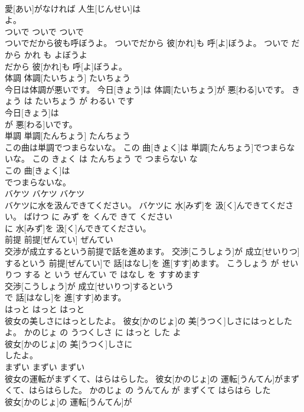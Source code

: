 \documentclass[8pt]{extreport}
\begin{document}
\begin{CJK}{UTF8}{min}
\\	愛[あい]がなければ 人生[じんせい]は
\\	よ。			
\\	ついで	ついで	ついで	
\\	ついでだから彼も呼ぼうよ。	ついでだから 彼[かれ]も 呼[よ]ぼうよ。	ついで だから かれ も よぼうよ	
\\	だから 彼[かれ]も 呼[よ]ぼうよ。			
\\	体調	体調[たいちょう]	たいちょう	
\\	今日は体調が悪いです。	今日[きょう]は 体調[たいちょう]が 悪[わる]いです。	きょう は たいちょう が わるい です	
\\	今日[きょう]は
\\	が 悪[わる]いです。			
\\	単調	単調[たんちょう]	たんちょう	
\\	この曲は単調でつまらないな。	この 曲[きょく]は 単調[たんちょう]でつまらないな。	この きょく は たんちょう で つまらない な	
\\	この 曲[きょく]は
\\	でつまらないな。			
\\	バケツ	バケツ	バケツ	
\\	バケツに水を汲んできてください。	バケツに 水[みず]を 汲[く]んできてください。	ばけつ に みず を くんで きて ください	
\\	に 水[みず]を 汲[く]んできてください。			
\\	前提	前提[ぜんてい]	ぜんてい	
\\	交渉が成立するという前提で話を進めます。	交渉[こうしょう]が 成立[せいりつ]するという 前提[ぜんてい]で 話[はなし]を 進[すす]めます。	こうしょう が せいりつ する と いう ぜんてい で はなし を すすめます	
\\	交渉[こうしょう]が 成立[せいりつ]するという
\\	で 話[はなし]を 進[すす]めます。			
\\	はっと	はっと	はっと	
\\	彼女の美しさにはっとしたよ。	彼女[かのじょ]の 美[うつく]しさにはっとしたよ。	かのじょ の うつくしさ に はっと した よ	
\\	彼女[かのじょ]の 美[うつく]しさに
\\	したよ。			
\\	まずい	まずい	まずい	
\\	彼女の運転がまずくて、はらはらした。	彼女[かのじょ]の 運転[うんてん]がまずくて、はらはらした。	かのじょ の うんてん が まずくて はらはら した	
\\	彼女[かのじょ]の 運転[うんてん]が

\end{CJK}
\end{document}
